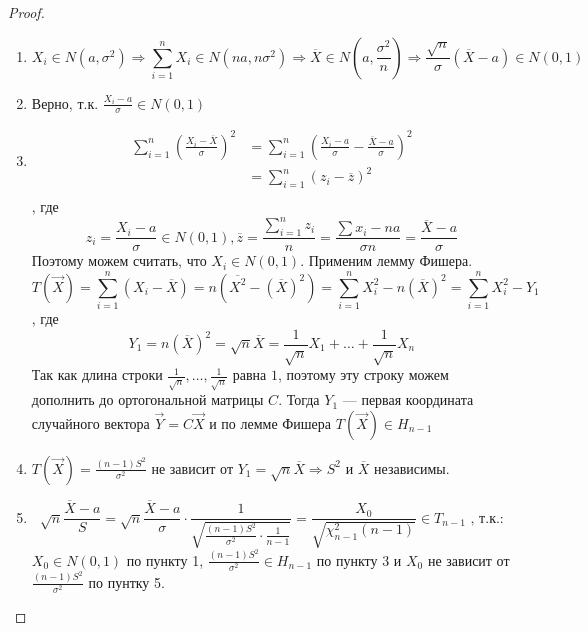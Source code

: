 \begin{proof}\itemfix
    \begin{enumerate}
        \item \[X_i \in N(a, \sigma^2) \Rightarrow \sum_{i=1}^{n} X_i \in N(na, n\sigma^2) \Rightarrow \overline{X} \in N\left(a, \frac{\sigma^2}{n}\right) \Rightarrow \frac{\sqrt{n}}{\sigma}(\overline{X} - a) \in N(0, 1)\]
        \item Верно, т.к. \(\frac{X_i - a}{\sigma} \in N(0, 1)\)
        \item \begin{align*}
                  \sum_{i=1}^{n} \left(\frac{X_i - \overline{X}}{\sigma}\right)^2 & = \sum_{i=1}^{n} \left(\frac{X_i - a}{\sigma} - \frac{ \overline{X} - a}{\sigma}\right)^2 \\
                                                                                  & = \sum_{i=1}^{n} (z_i - \overline{z})^2                                                   \\
              \end{align*}
              , где \[z_i = \frac{X_i - a}{\sigma} \in N(0, 1), \overline{z} = \frac{\sum_{i=1}^{n} z_i}{n} = \frac{\sum x_i - na}{\sigma n}= \frac{ \overline{X} - a}{\sigma}\]
              Поэтому можем считать, что \(X_i \in N(0, 1)\). Применим лемму Фишера.
              \[T(\vec{X}) = \sum_{i=1}^{n} \left(X_i - \overline{X}\right) = n (\overline{X^2} - (\overline{X})^2) = \sum_{i=1}^{n} X_i^2 - n (\overline{X})^2 = \sum_{i=1}^{n} X_i^2 - Y_1\]
              , где
              \[Y_1 = n(\overline{X})^2 = \sqrt{n} \overline{X} = \frac{1}{\sqrt{n}} X_1 + \dots + \frac{1}{\sqrt{n}} X_n\]
              Так как длина строки \(\frac{1}{\sqrt{n}}, \dots , \frac{1}{\sqrt{n}}\) равна \(1\), поэтому эту строку можем дополнить до ортогональной матрицы \(C\). Тогда \(Y_1\) --- первая координата случайного вектора \(\vec{Y} = C \vec{X}\) и по лемме Фишера \(T(\vec{X}) \in H_{n - 1}\) \setcounter{enumi}{4}
        \item \(T(\vec{X}) = \frac{(n - 1)S^2}{\sigma^2}\) не зависит от \(Y_1 = \sqrt{n} \overline{X} \Rightarrow S^2\) и \(\overline{X}\) независимы. \setcounter{enumi}{3}
        \item \[\sqrt{n} \frac{ \overline{X} - a}{S} = \sqrt{n} \frac{\overline{X} - a}{\sigma} \cdot \frac{1}{\sqrt{\frac{(n - 1)S^2}{\sigma^2} \cdot \frac{1}{n - 1}}} = \frac{X_0}{\sqrt{\chi_{n - 1}^2 (n - 1)}} \in T_{n - 1} \text{ , т.к.:}\]
              \(X_0 \in N(0, 1)\) по пункту 1, \(\frac{(n - 1)S^2}{\sigma^2} \in H_{n-1}\) по пункту 3 и \(X_0\) не зависит от \(\frac{(n - 1)S^2}{\sigma^2}\) по пунтку 5.
    \end{enumerate}
\end{proof}
